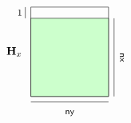 \documentclass[10pt]{article}
\begin{document}
\[\begin{tikzpicture}
%
\node[draw=black,minimum width=7em,minimum height=8em,rectangle]  at (0,0) {};
\node[draw=black,fill=green!20,minimum width=7em,minimum height=7em,rectangle]  at (0,-0.5em) {};
%
\node[]  at (-5em,0) {${\bf H}_x$};
%
\draw[] (-4em,4em) -- (-4em,3em);
\draw[] (-3.5em,-4.5em) -- (3.5em,-4.5em);
\draw[] (4em,-4em) -- (4em,3em);
%
\node[]  at (0,-5.5em) {\footnotesize{{\sf ny}}};
\node[rotate=-90]  at (4.7em,-0.5em) {\footnotesize{{\sf nx}}};
\node[]  at (-4.5em,3.5em) {\footnotesize{1}};
\end{tikzpicture}
\]
\end{document}
